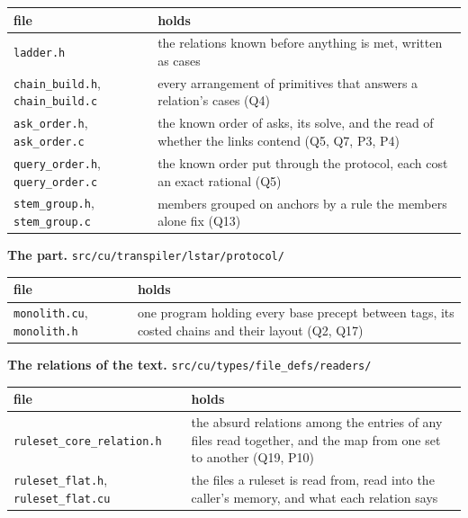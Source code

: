{\small
\setlength{\tabcolsep}{6pt}
\begin{longtable}{>{\RaggedRight\arraybackslash}p{}>{\RaggedRight\arraybackslash}p{}}
\toprule
file & holds \\
\midrule
\endhead
\texttt{ladder.\allowbreak{}h} & the relations known before anything is met, written as cases \\
\texttt{chain\_\allowbreak{}build.\allowbreak{}h}, \texttt{chain\_\allowbreak{}build.\allowbreak{}c} & every arrangement of primitives that answers a relation's cases (Q4) \\
\texttt{ask\_\allowbreak{}order.\allowbreak{}h}, \texttt{ask\_\allowbreak{}order.\allowbreak{}c} & the known order of asks, its solve, and the read of whether the links contend (Q5, Q7, P3, P4) \\
\texttt{query\_\allowbreak{}order.\allowbreak{}h}, \texttt{query\_\allowbreak{}order.\allowbreak{}c} & the known order put through the protocol, each cost an exact rational (Q5) \\
\texttt{stem\_\allowbreak{}group.\allowbreak{}h}, \texttt{stem\_\allowbreak{}group.\allowbreak{}c} & members grouped on anchors by a rule the members alone fix (Q13) \\
\bottomrule
\end{longtable}
}

\textbf{The part.} \texttt{src/\allowbreak{}cu/\allowbreak{}transpiler/\allowbreak{}lstar/\allowbreak{}protocol/\allowbreak{}}

{\small
\setlength{\tabcolsep}{6pt}
\begin{longtable}{>{\RaggedRight\arraybackslash}p{}>{\RaggedRight\arraybackslash}p{}}
\toprule
file & holds \\
\midrule
\endhead
\texttt{monolith.\allowbreak{}cu}, \texttt{monolith.\allowbreak{}h} & one program holding every base precept between tags, its costed chains and their layout (Q2, Q17) \\
\bottomrule
\end{longtable}
}

\textbf{The relations of the text.} \texttt{src/\allowbreak{}cu/\allowbreak{}types/\allowbreak{}file\_\allowbreak{}defs/\allowbreak{}readers/\allowbreak{}}

{\small
\setlength{\tabcolsep}{6pt}
\begin{longtable}{>{\RaggedRight\arraybackslash}p{}>{\RaggedRight\arraybackslash}p{}}
\toprule
file & holds \\
\midrule
\endhead
\texttt{ruleset\_\allowbreak{}core\_\allowbreak{}relation.\allowbreak{}h} & the absurd relations among the entries of any files read together, and the map from one set to another (Q19, P10) \\
\texttt{ruleset\_\allowbreak{}flat.\allowbreak{}h}, \texttt{ruleset\_\allowbreak{}flat.\allowbreak{}cu} & the files a ruleset is read from, read into the caller's memory, and what each relation says \\
\bottomrule
\end{longtable}
}

